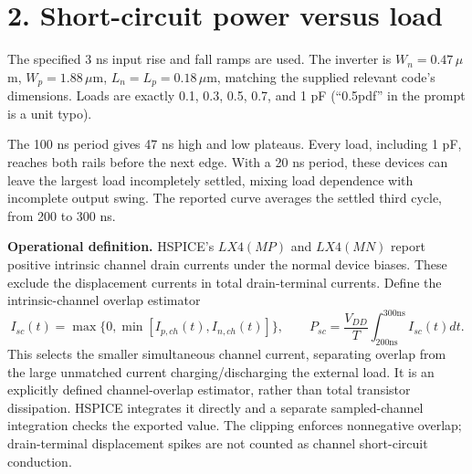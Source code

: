 \documentclass[11pt]{article}
\begin{document}
\newpage\section*{2. Short-circuit power versus load}
The specified 3 ns input rise and fall ramps are used. The inverter is $W_n=0.47\,\mu$m, $W_p=1.88\,\mu$m, $L_n=L_p=0.18\,\mu$m, matching the supplied relevant code's dimensions. Loads are exactly 0.1, 0.3, 0.5, 0.7, and 1 pF (``0.5pdf'' in the prompt is a unit typo).

The 100 ns period gives 47 ns high and low plateaus. Every load, including 1 pF, reaches both rails before the next edge. With a 20 ns period, these devices can leave the largest load incompletely settled, mixing load dependence with incomplete output swing. The reported curve averages the settled third cycle, from 200 to 300 ns.

\textbf{Operational definition.} HSPICE's $LX4(MP)$ and $LX4(MN)$ report positive intrinsic channel drain currents under the normal device biases. These exclude the displacement currents in total drain-terminal currents. Define the intrinsic-channel overlap estimator
\[
I_{sc}(t)=\max\{0,\min[I_{p,ch}(t),I_{n,ch}(t)]\},\qquad
P_{sc}=\frac{V_{DD}}{T}\int_{200\mathrm{ns}}^{300\mathrm{ns}}I_{sc}(t)dt.
\]
This selects the smaller simultaneous channel current, separating overlap from the large unmatched current charging/discharging the external load. It is an explicitly defined channel-overlap estimator, rather than total transistor dissipation. HSPICE integrates it directly and a separate sampled-channel integration checks the exported value. The clipping enforces nonnegative overlap; drain-terminal displacement spikes are not counted as channel short-circuit conduction.
\end{document}

